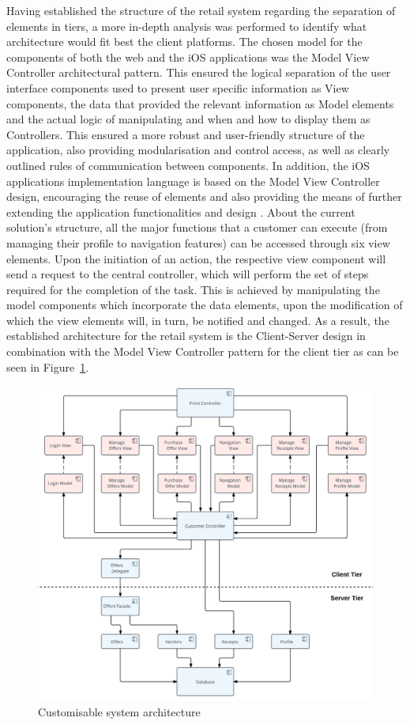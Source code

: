 Having established the structure of the retail system regarding the separation of elements in tiers, a more in-depth analysis was performed to identify what architecture would fit best the client platforms. The chosen model for the components of both the web and the iOS applications was the Model View Controller architectural pattern. This ensured the logical separation of the user interface components used to present user specific information as View components, the data that provided the relevant information as Model elements and the actual logic of manipulating and when and how to display them as Controllers. This ensured a more robust and user-friendly structure of the application, also providing modularisation and control access, as well as clearly outlined rules of communication between components. In addition, the iOS applications implementation language is based on the Model View Controller design, encouraging the reuse of elements and also providing the means of further extending the application functionalities and design \cite{client-server_model_2017}. About the current solution's structure, all the major functions that a customer can execute (from managing their profile to navigation features) can be accessed through six view elements. Upon the initiation of an action, the respective view component will send a request to the central controller, which will perform the set of steps required for the completion of the task. This is achieved by manipulating the model components which incorporate the data elements, upon the modification of which the view elements will, in turn, be notified and changed. As a result, the established architecture for the retail system is the Client-Server design in combination with the Model View Controller pattern for the client tier as can be seen in Figure~\ref{fig:system_architecture}.\\

\begin{figure}[!ht]
\centering
\includegraphics[scale=0.22]{img/System_Architecture.png}
\caption{Customisable system architecture}
\label{fig:system_architecture}
\end{figure}


